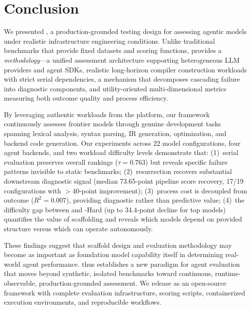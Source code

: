 \section{Conclusion}

We presented \eva{}, a production-grounded testing design for assessing agentic models under realistic infrastructure engineering conditions.
Unlike traditional benchmarks that provide fixed datasets and scoring functions, \eva{} provides a \emph{methodology}---a unified assessment architecture supporting heterogeneous LLM providers and agent SDKs, realistic long-horizon compiler construction workloads with strict serial dependencies, a \resurrection{} mechanism that decomposes cascading failure into diagnostic components, and utility-oriented multi-dimensional metrics measuring both outcome quality and process efficiency.

By leveraging authentic workloads from the \yatcc{} platform, our framework continuously assesses frontier models through genuine development tasks spanning lexical analysis, syntax parsing, IR generation, optimization, and backend code generation.
Our experiments across 22 model configurations, four agent backends, and two workload difficulty levels demonstrate that:
(1)~serial evaluation preserves overall rankings ($\tau = 0.763$) but reveals specific failure patterns invisible to static benchmarks;
(2)~resurrection recovers substantial downstream diagnostic signal (median 73.65-point pipeline score recovery, 17/19 configurations with $>40$-point improvement);
(3)~process cost is decoupled from outcome ($R^2 = 0.007$), providing diagnostic rather than predictive value;
(4)~the difficulty gap between \yatcc{} and \yatcc{}-Hard (up to 34.4-point decline for top models) quantifies the value of scaffolding and reveals which models depend on provided structure versus which can operate autonomously.

These findings suggest that scaffold design and evaluation methodology may become as important as foundation model capability itself in determining real-world agent performance.
\eva{} thus establishes a new paradigm for agent evaluation that moves beyond synthetic, isolated benchmarks toward continuous, runtime-observable, production-grounded assessment.
We release \eva{} as an open-source framework with complete evaluation infrastructure, scoring scripts, containerized execution environments, and reproducible workflows.